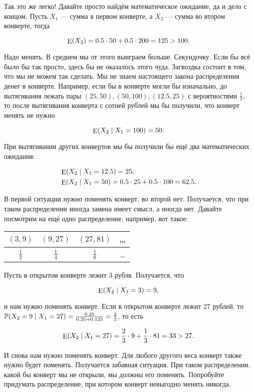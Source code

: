 Так это же легко! Давайте просто найдём математическое ожидание, да и дело с концом. Пусть $X_1$ --- сумма в первом конверте, а $X_2$ --- сумма во втором конверте, тогда

\[ \operatorname{\mathop{E}}(X_2) = 0.5 \cdot 50 + 0.5 \cdot 200  = 125 > 100. \]

Надо менять. В среднем мы от этого выиграем больше. Секундочку. Если бы всё было бы так просто, здесь бы не оказалось этого чуда. Загвоздка состоит в том, что мы не можем так сделать. Мы не знаем настоящего закона распределения денег в конверте. Например, если бы в конверте могли бы изначально, до вытягивания лежать пары $(25,50), (50,100), (12.5,25)$ с вероятностями $\frac{1}{3}$, то после вытягивания конверта с сотней рублей мы бы получили, что конверт менять не нужно

\[ \operatorname{\mathop{E}}(X_2 \mid X_1 = 100) = 50. \]

 При вытягивании других конвертов мы бы получили бы ещё два математических ожидания:

\begin{equation*}
\begin{aligned}
& \operatorname{\mathop{E}}(X_2 \mid X_1 = 12.5) = 25, \\ 
& \operatorname{\mathop{E}}(X_2 \mid X_1 = 50) = 0.5 \cdot 25 + 0.5 \cdot 100 = 62.5.
\end{aligned}
\end{equation*}

В первой ситуации нужно поменять конверт, во второй нет. Получается, что при таком распределении иногда замена имеет смысл, а иногда нет.  Давайте посмотрим на ещё одно распределение, например, вот такое: 

\begin{center}
\begin{tabular}{c|c|c|c}
$(3,9)$ & $(9,27)$ & $(27,81)$ & \ldots  \\ \hline
$\frac{1}{2}$ & $\frac{1}{4}$ & $\frac{1}{8}$ & \ldots
\end{tabular}
\end{center}

Пусть в открытом конверте лежит $3$ рубля. Получается, что

\[\operatorname{\mathop{E}}(X_2 \mid X_1 = 3) = 9,\]

и нам нужно поменять конверт. Если в открытом конверте лежит $27$ рублей, то $\mathbb{P}(X_2 = 9 \mid X_1 = 27) = \frac{0.25}{0.25 + 0.125} = \frac{2}{3}$, то есть

\[ \operatorname{\mathop{E}}(X_2 \mid X_1 = 27) = \frac{2}{3} \cdot 9 + \frac{1}{3} \cdot 81 = 33 > 27.\]

И снова нам нужно поменять конверт. Для любого другого веса конверт также нужно будет поменять. Получается забавная ситуация. При таком распределении, какой бы конверт мы не открыли, мы должны его поменять. Попробуйте придумать распределение, при котором конверт невыгодно менять никогда. 

